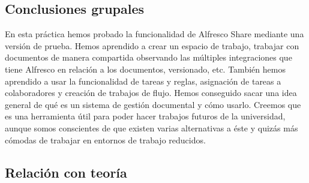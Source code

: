 \documentclass{article}
\begin{document}
\subsection{Conclusiones grupales}

En esta práctica hemos probado la funcionalidad de Alfresco Share mediante una versión de prueba. Hemos aprendido a crear un espacio de trabajo, trabajar con documentos de manera compartida observando las múltiples integraciones que tiene Alfresco en relación a los documentos, versionado, etc. También hemos aprendido a usar la funcionalidad de tareas y reglas, asignación de tareas a colaboradores y creación de trabajos de flujo.
Hemos conseguido sacar una idea general de qué es un sistema de gestión documental y cómo usarlo.
Creemos que es una herramienta útil para poder hacer trabajos futuros de la universidad, aunque somos conscientes de que existen varias alternativas a éste y quizás más cómodas de trabajar en entornos de trabajo reducidos. 


\subsection{Relación con teoría}
\end{document}
